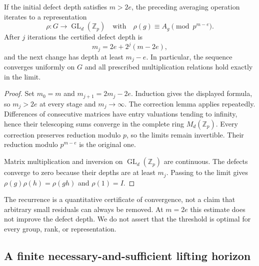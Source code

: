 \begin{theorem}\label{thm:convergent-action-repair}
If the initial defect depth satisfies $m>2e$, the preceding averaging operation iterates to a representation
\[
 \rho:G\longrightarrow\operatorname{GL}_d(\mathbb Z_p)
 \quad\text{with}\quad
 \rho(g)\equiv A_g\pmod{p^{m-e}}.
\]
After $j$ iterations the certified defect depth is
\[
 m_j=2e+2^j(m-2e),
\]
and the next change has depth at least $m_j-e$. In particular, the sequence converges uniformly on $G$ and all prescribed multiplication relations hold exactly in the limit.
\end{theorem}
\begin{proof}
Set $m_0=m$ and $m_{j+1}=2m_j-2e$. Induction gives the displayed formula, so $m_j>2e$ at every stage and $m_j\to\infty$. The correction lemma applies repeatedly. Differences of consecutive matrices have entry valuations tending to infinity, hence their telescoping sums converge in the complete ring $M_d(\mathbb Z_p)$. Every correction preserves reduction modulo $p$, so the limits remain invertible. Their reduction modulo $p^{m-e}$ is the original one.

Matrix multiplication and inversion on $\operatorname{GL}_d(\mathbb Z_p)$ are continuous. The defects converge to zero because their depths are at least $m_j$. Passing to the limit gives $\rho(g)\rho(h)=\rho(gh)$ and $\rho(1)=I$.
\end{proof}

The recurrence is a quantitative certificate of convergence, not a claim that arbitrary small residuals can always be removed. At $m=2e$ this estimate does not improve the defect depth. We do not assert that the threshold is optimal for every group, rank, or representation.

\subsection{A finite necessary-and-sufficient lifting horizon}

